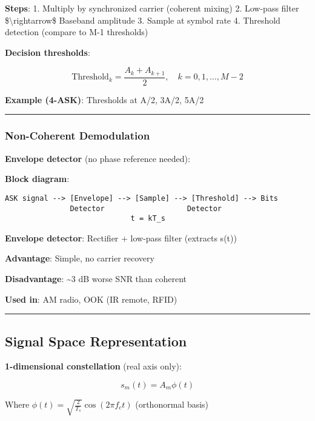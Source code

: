 \textbf{Steps}: 1. Multiply by synchronized carrier (coherent mixing) 2.
Low-pass filter \$\textbackslash rightarrow\$ Baseband amplitude 3.
Sample at symbol rate 4. Threshold detection (compare to M-1 thresholds)

\textbf{Decision thresholds}:

\[
\text{Threshold}_k = \frac{A_k + A_{k+1}}{2}, \quad k = 0, 1, \ldots, M-2
\]

\textbf{Example (4-ASK)}: Thresholds at A/2, 3A/2, 5A/2

\begin{center}\rule{0.5\linewidth}{0.5pt}\end{center}

\subsubsection{Non-Coherent
Demodulation}\label{non-coherent-demodulation}

\textbf{Envelope detector} (no phase reference needed):

\textbf{Block diagram}:

\begin{verbatim}
ASK signal --> [Envelope] --> [Sample] --> [Threshold] --> Bits
               Detector                   Detector
                             t = kT_s
\end{verbatim}

\textbf{Envelope detector}: Rectifier + low-pass filter (extracts
\textbar s(t)\textbar)

\textbf{Advantage}: Simple, no carrier recovery

\textbf{Disadvantage}: \textasciitilde3 dB worse SNR than coherent

\textbf{Used in}: AM radio, OOK (IR remote, RFID)

\begin{center}\rule{0.5\linewidth}{0.5pt}\end{center}

\subsection{Signal Space
Representation}\label{signal-space-representation}

\textbf{1-dimensional constellation} (real axis only):

\[
s_m(t) = A_m \phi(t)
\]

Where \(\phi(t) = \sqrt{\frac{2}{T_s}} \cos(2\pi f_c t)\) (orthonormal
basis)

